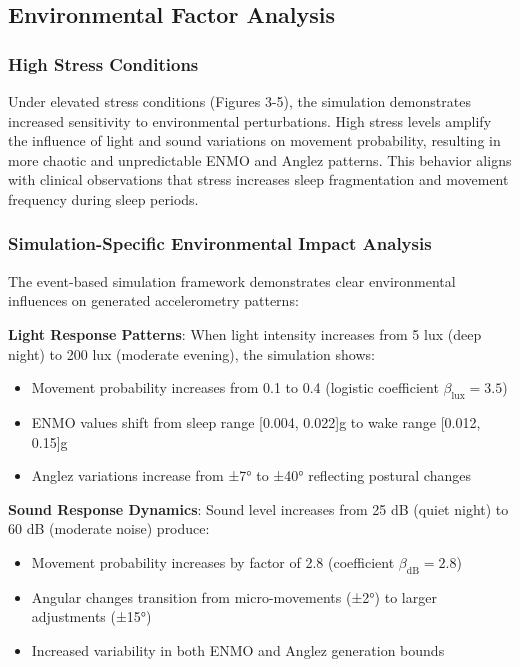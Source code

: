 \documentclass[conference]{IEEEtran}
\begin{document}
\subsection{Environmental Factor Analysis}

\subsubsection{High Stress Conditions}
Under elevated stress conditions (Figures 3-5), the simulation demonstrates increased sensitivity to environmental perturbations. High stress levels amplify the influence of light and sound variations on movement probability, resulting in more chaotic and unpredictable ENMO and Anglez patterns. This behavior aligns with clinical observations that stress increases sleep fragmentation and movement frequency during sleep periods.

\subsubsection{Simulation-Specific Environmental Impact Analysis}

The event-based simulation framework demonstrates clear environmental influences on generated accelerometry patterns:

\textbf{Light Response Patterns}: When light intensity increases from 5 lux (deep night) to 200 lux (moderate evening), the simulation shows:
\begin{itemize}
	\item Movement probability increases from 0.1 to 0.4 (logistic coefficient $\beta_{\text{lux}} = 3.5$)
	\item ENMO values shift from sleep range [0.004, 0.022]g to wake range [0.012, 0.15]g
	\item Anglez variations increase from ±7° to ±40° reflecting postural changes
\end{itemize}

\textbf{Sound Response Dynamics}: Sound level increases from 25 dB (quiet night) to 60 dB (moderate noise) produce:
\begin{itemize}
	\item Movement probability increases by factor of 2.8 (coefficient $\beta_{\text{dB}} = 2.8$)
	\item Angular changes transition from micro-movements (±2°) to larger adjustments (±15°)
	\item Increased variability in both ENMO and Anglez generation bounds
\end{itemize}
\end{document}
